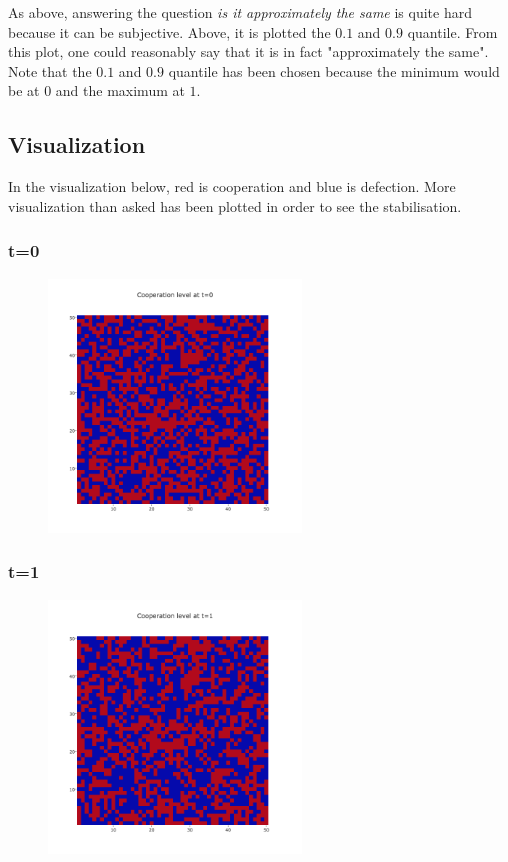\documentclass[11pt]{article}
\begin{document}
As above, answering the question \textit{is it approximately the same} is quite hard because it can be subjective. Above, it is plotted the $0.1$ and $0.9$ quantile. From this plot, one could reasonably say that it is in fact "approximately the same". Note that the $0.1$ and $0.9$ quantile has been chosen because the minimum would be at $0$ and the maximum at $1$.

\subsection{Visualization}

In the visualization below, red is cooperation and blue is defection. More visualization than asked has been plotted in order to see the stabilisation.

\subsubsection{t=0}

\begin{figure}[H]
\centering
   \includegraphics[width=0.6\textwidth]{img/part2/part2-moore-visu-0.png}
\end{figure}

\subsubsection{t=1}

\begin{figure}[H]
\centering
   \includegraphics[width=0.6\textwidth]{img/part2/part2-moore-visu-1.png}
\end{figure}
\end{document}
